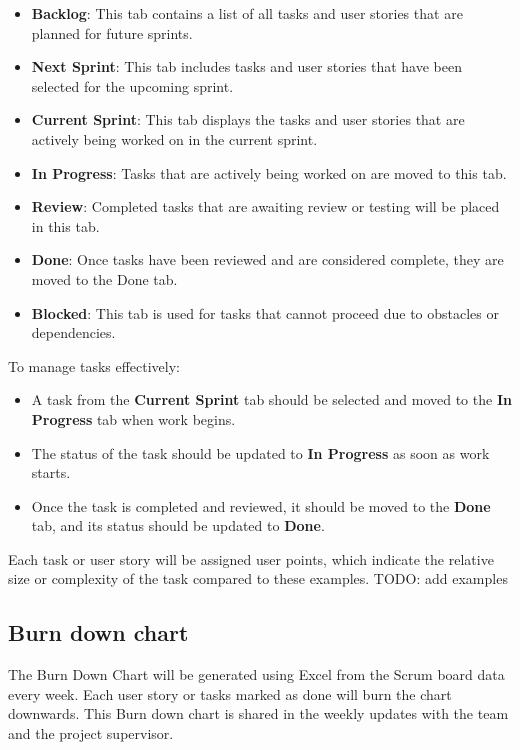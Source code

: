 \documentclass{projdoc}
\begin{document}
\begin{itemize}
	\item \textbf{Backlog}: This tab contains a list of all tasks and user stories that are planned for future sprints.
	\item \textbf{Next Sprint}: This tab includes tasks and user stories that have been selected for the upcoming sprint.
	\item \textbf{Current Sprint}: This tab displays the tasks and user stories that are actively being worked on in the current sprint.
	\item \textbf{In Progress}: Tasks that are actively being worked on are moved to this tab.
	\item \textbf{Review}: Completed tasks that are awaiting review or testing will be placed in this tab.
	\item \textbf{Done}: Once tasks have been reviewed and are considered complete, they are moved to the Done tab.
	\item \textbf{Blocked}: This tab is used for tasks that cannot proceed due to obstacles or dependencies.
\end{itemize}

\noindent
To manage tasks effectively:
\begin{itemize}
	\item A task from the \textbf{Current Sprint} tab should be selected and moved to the \textbf{In Progress} tab when work begins. 
	\item The status of the task should be updated to \textbf{In Progress} as soon as work starts.
	\item Once the task is completed and reviewed, it should be moved to the \textbf{Done} tab, and its status should be updated to \textbf{Done}.
\end{itemize}

\noindent
Each task or user story will be assigned user points, which indicate the relative size or complexity of the task compared to these examples.
TODO: add examples

\subsection{Burn down chart}
The Burn Down Chart will be generated using Excel from the Scrum board data every week.
Each user story or tasks marked as done will burn the chart downwards.
This Burn down chart is shared in the weekly updates with the team and the project supervisor.
\newpage
\end{document}
